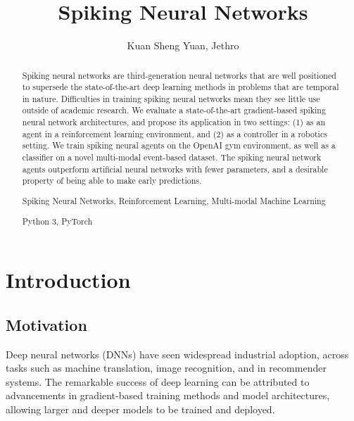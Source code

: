 \documentclass[fyp]{socreport}
\begin{document}
\author{Kuan Sheng Yuan, Jethro}
\title{Spiking Neural Networks}
\maketitle

\begin{abstract}
  Spiking neural networks are third-generation neural networks that are well
  positioned to supersede the state-of-the-art deep learning methods in problems
  that are temporal in nature. Difficulties in training spiking neural networks
  mean they see little use outside of academic research. We evaluate a
  state-of-the-art gradient-based spiking neural network architectures, and
  propose its application in two settings: (1) as an agent in a reinforcement
  learning environment, and (2) as a controller in a robotics setting. We train
  spiking neural agents on the OpenAI gym environment, as well as a classifier
  on a novel multi-modal event-based dataset. The spiking neural network agents
  outperform artificial neural networks with fewer parameters, and a desirable
  property of being able to make early predictions.

  \begin{keywords}
    Spiking Neural Networks, Reinforcement Learning, Multi-modal Machine Learning
  \end{keywords}

  \begin{implement} Python 3, PyTorch
  \end{implement}
\end{abstract}

\tableofcontents

\chapter{Introduction}

\section{Motivation}

Deep neural networks (DNNs) have seen widespread industrial adoption, across
tasks such as machine translation, image recognition, and in recommender
systems. The remarkable success of deep learning can be attributed to
advancements in gradient-based training methods and model architectures,
allowing larger and deeper models to be trained and deployed.
\end{document}
